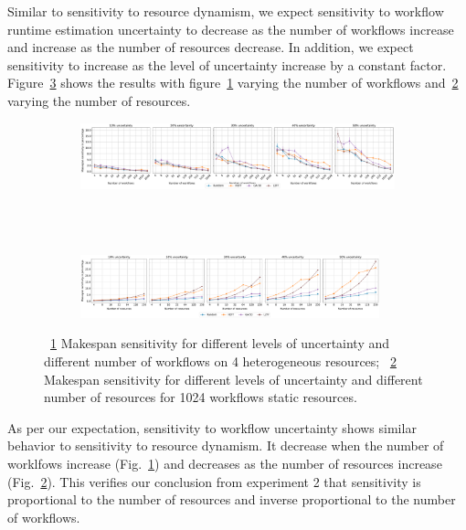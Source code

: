 Similar to sensitivity to resource dynamism, we expect sensitivity to workflow runtime estimation uncertainty to decrease as the number of workflows increase and increase as the number of resources decrease.
In addition, we expect sensitivity to increase as the level of uncertainty increase by a constant factor.
Figure~\ref{fig:inaccur_st} shows the results with figure~\ref{fig:InaccurStHeteroCampaigns_4StHeteroResourcesSens} varying the number of workflows and~\ref{fig:InaccurStHeteroResources_StHeteroCampaignsSens} varying the number of resources.

\begin{figure}[ht!]
    \centering
    \begin{subfigure}[b]{0.85\textwidth}
        \includegraphics[width=.95\textwidth]{figures/campaign/InaccurStHeteroCampaigns_4StHeteroResourcesSens.pdf}
        \caption{}
        \label{fig:InaccurStHeteroCampaigns_4StHeteroResourcesSens}
    \end{subfigure}\\
    ~ 
    \begin{subfigure}[b]{0.85\textwidth}
        \includegraphics[width=0.95\textwidth]{figures/campaign/InaccurStHeteroResources_StHeteroCampaignsSens.pdf}
        \caption{}
        \label{fig:InaccurStHeteroResources_StHeteroCampaignsSens}
    \end{subfigure}
    \caption{~\ref{fig:InaccurStHeteroCampaigns_4StHeteroResourcesSens} Makespan sensitivity for different levels of uncertainty and different number of workflows on 4 heterogeneous resources;
    ~\ref{fig:InaccurStHeteroResources_StHeteroCampaignsSens} Makespan sensitivity for different levels of uncertainty and different number of resources for 1024 workflows static resources.}
    \label{fig:inaccur_st}
\end{figure}

As per our expectation, sensitivity to workflow uncertainty shows similar behavior to sensitivity to resource dynamism.
It decrease when the number of worklfows increase (Fig.~\ref{fig:InaccurStHeteroCampaigns_4StHeteroResourcesSens}) and decreases as the number of resources increase (Fig.~\ref{fig:InaccurStHeteroResources_StHeteroCampaignsSens}).
This verifies our conclusion from experiment 2 that sensitivity is proportional to the number of resources and inverse proportional to the number of workflows.

